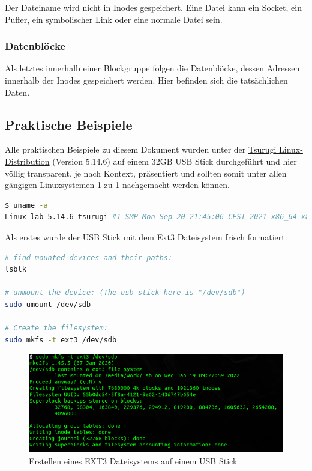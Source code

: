 Der Dateiname wird nicht in Inodes gespeichert. Eine Datei kann ein Socket, ein Puffer, ein symbolischer Link oder eine normale Datei sein.

\subsubsection{Datenblöcke}

Als letztes innerhalb einer Blockgruppe folgen die Datenblöcke, dessen Adressen innerhalb der Inodes gespeichert werden. Hier befinden sich die tatsächlichen Daten.


\subsection{Praktische Beispiele}

Alle praktischen Beispiele zu diesem Dokument wurden unter der \href{https://tsurugi-linux.org/}{Tsurugi Linux-Distribution}  (Version 5.14.6) auf einem 32GB USB Stick durchgeführt und hier völlig transparent, je nach Kontext, präsentiert und sollten somit unter allen gängigen Linuxsystemen 1-zu-1 nachgemacht werden können. 

\begin{lstlisting}[language=bash]
$ uname -a
Linux lab 5.14.6-tsurugi #1 SMP Mon Sep 20 21:45:06 CEST 2021 x86_64 x86_64 x86_64 GNU/Li
\end{lstlisting}  

\newpage
	
Als erstes wurde der USB Stick mit dem Ext3 Dateisystem frisch formatiert:

\begin{lstlisting}[language=bash,caption={Create the FS}]
# find mounted devices and their paths:
lsblk

# unmount the device: (The usb stick here is "/dev/sdb")
sudo umount /dev/sdb

# Create the filesystem:
sudo mkfs -t ext3 /dev/sdb
\end{lstlisting}  

\begin{figure}[H]
	\centering
	\includegraphics[width=12cm,keepaspectratio=true]{pictures/createfs.png}
	\caption{
		Erstellen eines EXT3 Dateisystems auf einem USB Stick
	}
	\label{fig:createfs}
\end{figure}

